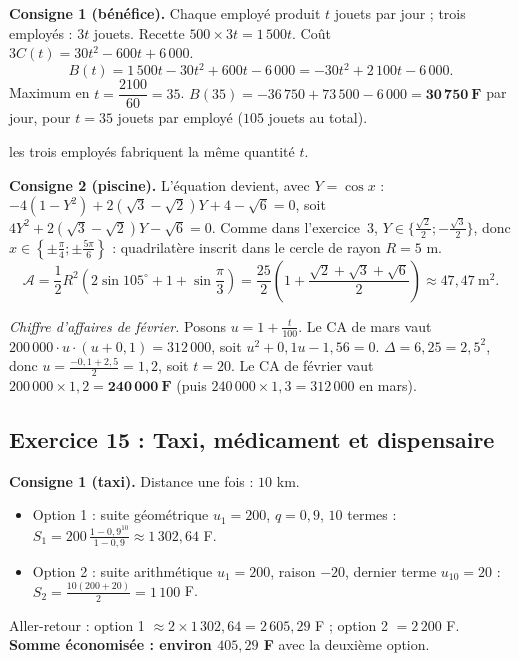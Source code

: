 \textbf{Consigne 1 (b\'en\'efice).} Chaque employ\'e produit $t$ jouets par jour ; trois employ\'es : $3t$ jouets.
Recette $500\times3t=1\,500t$. Co\^ut $3C(t)=30t^2-600t+6\,000$.
\[
B(t)=1\,500t-30t^2+600t-6\,000=-30t^2+2\,100t-6\,000.
\]
Maximum en $t=\dfrac{2100}{60}=35$. $B(35)=-36\,750+73\,500-6\,000=\mathbf{30\,750\ F}$ par jour,
pour $t=35$ jouets par employ\'e ($105$ jouets au total).
\begin{hyp}les trois employ\'es fabriquent la m\^eme quantit\'e $t$.\end{hyp}

\textbf{Consigne 2 (piscine).} L'\'equation devient, avec $Y=\cos x$ : $-4(1-Y^2)+2(\sqrt3-\sqrt2)Y+4-\sqrt6=0$, soit
$4Y^2+2(\sqrt3-\sqrt2)Y-\sqrt6=0$. Comme dans l'exercice~3, $Y\in\{\frac{\sqrt2}{2};-\frac{\sqrt3}{2}\}$, donc
$x\in\left\{\pm\frac{\pi}{4};\pm\frac{5\pi}{6}\right\}$ : quadrilat\`ere inscrit dans le cercle de rayon $R=5$ m.
\[
\mathcal A=\frac12R^2\left(2\sin105^\circ+1+\sin\frac{\pi}{3}\right)=\frac{25}{2}\left(1+\frac{\sqrt2+\sqrt3+\sqrt6}{2}\right)\approx 47{,}47\ \text{m}^2.
\]

\emph{Chiffre d'affaires de f\'evrier.} Posons $u=1+\frac{t}{100}$. Le CA de mars vaut $200\,000\cdot u\cdot(u+0{,}1)=312\,000$, soit
$u^2+0{,}1u-1{,}56=0$. $\Delta=6{,}25=2{,}5^2$, donc $u=\frac{-0{,}1+2{,}5}{2}=1{,}2$, soit $t=20$.
Le CA de f\'evrier vaut $200\,000\times1{,}2=\mathbf{240\,000\ F}$ (puis $240\,000\times1{,}3=312\,000$ en mars).

\subsection{Exercice 15 : Taxi, m\'edicament et dispensaire}

\textbf{Consigne 1 (taxi).} Distance une fois : $10$ km.
\begin{itemize}
  \item Option 1 : suite g\'eom\'etrique $u_1=200$, $q=0{,}9$, $10$ termes :
  $\displaystyle S_1=200\,\frac{1-0{,}9^{10}}{1-0{,}9}\approx1\,302{,}64$ F.
  \item Option 2 : suite arithm\'etique $u_1=200$, raison $-20$, dernier terme $u_{10}=20$ :
  $\displaystyle S_2=\frac{10(200+20)}{2}=1\,100$ F.
\end{itemize}
Aller-retour : option 1 $\approx2\times1\,302{,}64=2\,605{,}29$ F ; option 2 $=2\,200$ F.
\textbf{Somme \'economis\'ee : environ $405{,}29$ F} avec la deuxi\`eme option.

